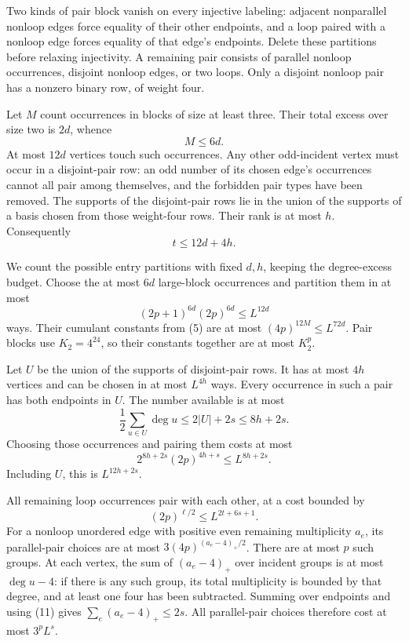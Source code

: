 \documentclass[11pt]{article}
\theoremstyle{definition}
\begin{document}
Two kinds of pair block vanish on every injective labeling:
adjacent nonparallel nonloop edges force equality of their other
endpoints, and a loop paired with a nonloop edge forces equality
of that edge's endpoints. Delete these partitions before relaxing
injectivity. A remaining pair consists of parallel nonloop
occurrences, disjoint nonloop edges, or two loops. Only a disjoint
nonloop pair has a nonzero binary row, of weight four.

Let \(M\) count occurrences in blocks of size at least three.
Their total excess over size two is \(2d\), whence
\[
 M\le6d.
\]
At most \(12d\) vertices touch such occurrences. Any other odd-incident
vertex must occur in a disjoint-pair row: an odd number of its chosen
edge's occurrences cannot all pair among themselves, and the forbidden
pair types have been removed. The supports of the disjoint-pair rows
lie in the union of the supports of a basis chosen from those
weight-four rows. Their rank is at most \(h\). Consequently
\[
                              t\le12d+4h.                       \tag{16}
\]

We count the possible entry partitions with fixed \(d,h\), keeping
the degree-excess budget. Choose the at most \(6d\) large-block
occurrences and partition them in at most
\[
                 (2p+1)^{6d}(2p)^{6d}\le L^{12d}
\]
ways. Their cumulant constants from (5) are at most
\((4p)^{12M}\le L^{72d}\). Pair blocks use \(K_2=4^{24}\), so
their constants together are at most \(K_2^p\).

Let \(U\) be the union of the supports of disjoint-pair rows.
It has at most \(4h\) vertices and can be chosen in at most
\(L^{4h}\) ways. Every occurrence in such a pair has both endpoints
in \(U\). The number available is at most
\[
 \frac12\sum_{u\in U}\deg u\le2|U|+2s\le8h+2s.
\]
Choosing those occurrences and pairing them costs at most
\[
 2^{8h+2s}(2p)^{4h+s}\le L^{8h+2s}.
\]
Including \(U\), this is \(L^{12h+2s}\).

All remaining loop occurrences pair with each other, at a cost
bounded by
\[
                  (2p)^{\ell/2}\le L^{2t+6s+1}.                 \tag{17}
\]
For a nonloop unordered edge with positive even remaining
multiplicity \(a_e\), its parallel-pair choices are at most
\(3(4p)^{(a_e-4)_+/2}\). There are at most \(p\) such groups.
At each vertex, the sum of \((a_e-4)_+\) over incident groups is
at most \(\deg u-4\): if there is any such group, its total
multiplicity is bounded by that degree, and at least one four
has been subtracted. Summing over endpoints and using (11) gives
\(\sum_e(a_e-4)_+\le2s\). All parallel-pair choices therefore
cost at most \(3^pL^s\).
\end{document}
